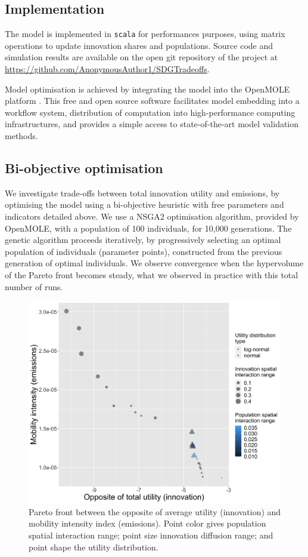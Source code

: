 \documentclass[final,5p,times,twocolumn,authoryear]{elsarticle}
\begin{document}
\subsection{Implementation}

The model is implemented in \texttt{scala} for performances purposes, using matrix operations to update innovation shares and populations. Source code and simulation results are available on the open git repository of the project at \url{https://github.com/AnonymousAuthor1/SDGTradeoffs}.

Model optimisation is achieved by integrating the model into the OpenMOLE platform \cite{reuillon2013openmole}. This free and open source software facilitates model embedding into a workflow system, distribution of computation into high-performance computing infrastructures, and provides a simple access to state-of-the-art model validation methods.


\subsection{Bi-objective optimisation}

We investigate trade-offs between total innovation utility and emissions, by optimising the model using a bi-objective heuristic with free parameters and indicators detailed above. We use a NSGA2 optimisation algorithm, provided by OpenMOLE, with a population of 100 individuals, for 10,000 generations. The genetic algorithm proceeds iteratively, by progressively selecting an optimal population of individuals (parameter points), constructed from the previous generation of optimal individuals. We observe convergence when the hypervolume of the Pareto front becomes steady, what we observed in practice with this total number of runs.


\begin{figure}
	\centering
	\includegraphics[width=\linewidth]{figures/Fig1.png}
	\caption{Pareto front between the opposite of average utility (innovation) and mobility intensity index (emissions). Point color gives population spatial interaction range; point size innovation diffusion range; and point shape the utility distribution.\label{fig:fig1}}
\end{figure}
\end{document}
